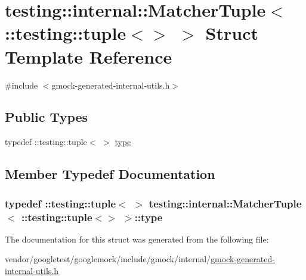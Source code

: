 \hypertarget{structtesting_1_1internal_1_1MatcherTuple_3_01_1_1testing_1_1tuple_3_4_01_4}{}\section{testing\+:\+:internal\+:\+:Matcher\+Tuple$<$ \+:\+:testing\+:\+:tuple$<$$>$ $>$ Struct Template Reference}
\label{structtesting_1_1internal_1_1MatcherTuple_3_01_1_1testing_1_1tuple_3_4_01_4}


{\ttfamily \#include $<$gmock-\/generated-\/internal-\/utils.\+h$>$}

\subsection*{Public Types}
\begin{DoxyCompactItemize}
\item 
typedef \+::testing\+::tuple$<$  $>$ \hyperlink{structtesting_1_1internal_1_1MatcherTuple_3_01_1_1testing_1_1tuple_3_4_01_4_a8d4493b2b299322e6c885dee5473ebd7}{type}
\end{DoxyCompactItemize}


\subsection{Member Typedef Documentation}
\subsubsection[{\texorpdfstring{type}{type}}]{\setlength{\rightskip}{0pt plus 5cm}typedef \+::testing\+::tuple$<$ $>$ {\bf testing\+::internal\+::\+Matcher\+Tuple}$<$ \+::testing\+::tuple$<$$>$ $>$\+::{\bf type}}\hypertarget{structtesting_1_1internal_1_1MatcherTuple_3_01_1_1testing_1_1tuple_3_4_01_4_a8d4493b2b299322e6c885dee5473ebd7}{}\label{structtesting_1_1internal_1_1MatcherTuple_3_01_1_1testing_1_1tuple_3_4_01_4_a8d4493b2b299322e6c885dee5473ebd7}


The documentation for this struct was generated from the following file\+:\begin{DoxyCompactItemize}
\item 
vendor/googletest/googlemock/include/gmock/internal/\hyperlink{gmock-generated-internal-utils_8h}{gmock-\/generated-\/internal-\/utils.\+h}\end{DoxyCompactItemize}

